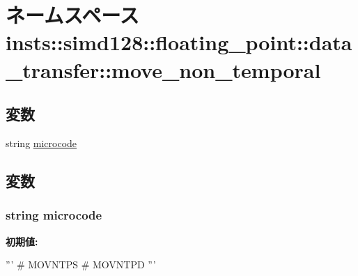 \hypertarget{namespaceinsts_1_1simd128_1_1floating__point_1_1data__transfer_1_1move__non__temporal}{
\section{ネームスペース insts::simd128::floating\_\-point::data\_\-transfer::move\_\-non\_\-temporal}
\label{namespaceinsts_1_1simd128_1_1floating__point_1_1data__transfer_1_1move__non__temporal}
}
\subsection*{変数}
\begin{DoxyCompactItemize}
\item 
string \hyperlink{namespaceinsts_1_1simd128_1_1floating__point_1_1data__transfer_1_1move__non__temporal_a770f11a173e99389a8802f0107ed8f52}{microcode}
\end{DoxyCompactItemize}


\subsection{変数}
\hypertarget{namespaceinsts_1_1simd128_1_1floating__point_1_1data__transfer_1_1move__non__temporal_a770f11a173e99389a8802f0107ed8f52}{
\subsubsection[{microcode}]{\setlength{\rightskip}{0pt plus 5cm}string {\bf microcode}}}
\label{namespaceinsts_1_1simd128_1_1floating__point_1_1data__transfer_1_1move__non__temporal_a770f11a173e99389a8802f0107ed8f52}
{\bfseries 初期値:}
\begin{DoxyCode}
'''
# MOVNTPS
# MOVNTPD
'''
\end{DoxyCode}
